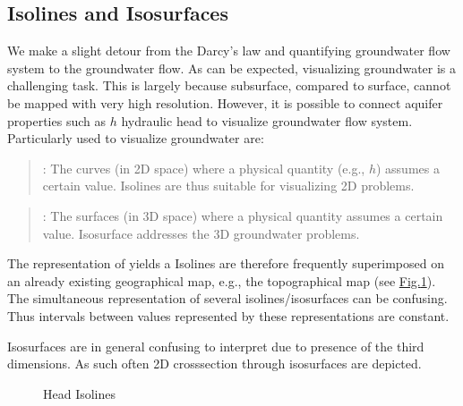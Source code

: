 \documentclass[letterpaper,10pt,english]{sphinxmanual}
\begin{document}
\subsection{Isolines and Isosurfaces}
\label{\detokenize{contents/flow/lecture_06/16_darcy_law_3D:isolines-and-isosurfaces}}
We make a slight detour from the Darcy’s law and quantifying groundwater flow system to  the groundwater flow. As can be expected, visualizing groundwater is a challenging task. This is largely because sub\sphinxhyphen{}surface, compared to surface, cannot be mapped with very high resolution. However, it is possible to connect aquifer properties such as \(h\) hydraulic head to visualize groundwater flow system. Particularly used to visualize groundwater are:
\begin{quote}

: The curves (in 2D space) where a physical quantity (e.g., \(h\)) assumes a certain value. Isolines are thus suitable for visualizing 2D problems.
\end{quote}
\begin{quote}

: The surfaces (in 3D space) where a physical quantity assumes a certain value. Isosurface addresses the 3D groundwater problems.
\end{quote}

The representation of  yields a  Isolines are therefore frequently superimposed on an already existing geographical map, e.g., the topographical map (see \hyperref[\detokenize{contents/flow/lecture_06/16_darcy_law_3D:isolines}]{Fig.\@ \ref{\detokenize{contents/flow/lecture_06/16_darcy_law_3D:isolines}}}). The simultaneous representation of several isolines/isosurfaces can be confusing. Thus intervals between values represented by these representations are constant.

Isosurfaces are in general confusing to interpret due to presence of the third dimensions. As such often 2D cross\sphinxhyphen{}section through isosurfaces are depicted.

\begin{figure}[htbp]
\centering
\capstart

\noindent{}
\caption{Head Isolines}\label{\detokenize{contents/flow/lecture_06/16_darcy_law_3D:isolines}}\end{figure}
\end{document}
